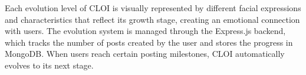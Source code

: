        Each evolution level of CLOI is visually represented by different facial expressions and characteristics that reflect its growth stage, creating an emotional connection with users. The evolution system is managed through the Express.js backend, which tracks the number of posts created by the user and stores the progress in MongoDB. When users reach certain posting milestones, CLOI automatically evolves to its next stage.
        


        


